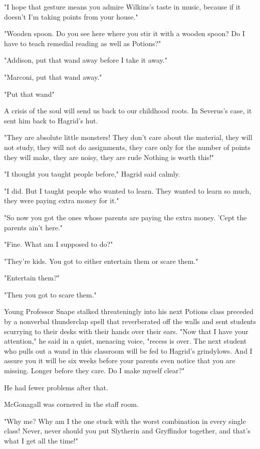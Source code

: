 "I hope that gesture means you admire Wilkins's taste in music, because if it doesn't I'm taking points from your house."

"Wooden spoon. Do you see here where you stir it with a wooden spoon? Do I have to teach remedial reading as well as Potions?"

"Addison, put that wand away before I take it away."

"Marconi, put that wand away."

"Put that wand{\el}"

A crisis of the soul will send us back to our childhood roots. In Severus's case, it sent him back to Hagrid's hut.

"They are absolute little monsters! They don't care about the material, they will not study, they will not do assignments, they care only for the number of points they will make, they are noisy, they are rude{\el} Nothing is worth this!"

"I thought you taught people before," Hagrid said calmly.

"I did. But I taught people who wanted to learn. They wanted to learn so much, they were paying extra money for it."

"So now you got the ones whose parents are paying the extra money. 'Cept the parents ain't here."

"Fine. What am I supposed to do?"

"They're kids. You got to either entertain them or scare them."

"Entertain them?"

"Then you got to scare them."

Young Professor Snape stalked threateningly into his next Potions class preceded by a nonverbal thunderclap spell that reverberated off the walls and sent students scurrying to their desks with their hands over their ears. "Now that I have your attention," he said in a quiet, menacing voice, "recess is over. The next student who pulls out a wand in this classroom will be fed to Hagrid's grindylows. And I assure you it will be six weeks before your parents even notice that you are missing. Longer before they care. Do I make myself clear?"

He had fewer problems after that.

\sbreak

McGonagall was cornered in the staff room.

"Why me? Why am I the one stuck with the worst combination in every single class! Never, never should you put Slytherin and Gryffindor together, and that's what I get all the time!"

